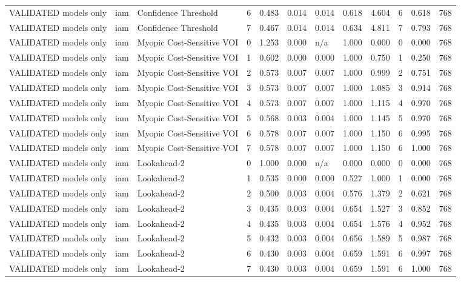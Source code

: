 \begin{table}[!ht]
{\begin{tabular}{llllllllllll}
VALIDATED models only & iam & Confidence Threshold & 6 & 0.483 & 0.014 & 0.014 & 0.618 & 4.604 & 6 & 0.618 & 768 \\
VALIDATED models only & iam & Confidence Threshold & 7 & 0.467 & 0.014 & 0.014 & 0.634 & 4.811 & 7 & 0.793 & 768 \\
VALIDATED models only & iam & Myopic Cost-Sensitive VOI & 0 & 1.253 & 0.000 & n/a & 1.000 & 0.000 & 0 & 0.000 & 768 \\
VALIDATED models only & iam & Myopic Cost-Sensitive VOI & 1 & 0.602 & 0.000 & 0.000 & 1.000 & 0.750 & 1 & 0.250 & 768 \\
VALIDATED models only & iam & Myopic Cost-Sensitive VOI & 2 & 0.573 & 0.007 & 0.007 & 1.000 & 0.999 & 2 & 0.751 & 768 \\
VALIDATED models only & iam & Myopic Cost-Sensitive VOI & 3 & 0.573 & 0.007 & 0.007 & 1.000 & 1.085 & 3 & 0.914 & 768 \\
VALIDATED models only & iam & Myopic Cost-Sensitive VOI & 4 & 0.573 & 0.007 & 0.007 & 1.000 & 1.115 & 4 & 0.970 & 768 \\
VALIDATED models only & iam & Myopic Cost-Sensitive VOI & 5 & 0.568 & 0.003 & 0.004 & 1.000 & 1.145 & 5 & 0.970 & 768 \\
VALIDATED models only & iam & Myopic Cost-Sensitive VOI & 6 & 0.578 & 0.007 & 0.007 & 1.000 & 1.150 & 6 & 0.995 & 768 \\
VALIDATED models only & iam & Myopic Cost-Sensitive VOI & 7 & 0.578 & 0.007 & 0.007 & 1.000 & 1.150 & 6 & 1.000 & 768 \\
VALIDATED models only & iam & Lookahead-2 & 0 & 1.000 & 0.000 & n/a & 0.000 & 0.000 & 0 & 0.000 & 768 \\
VALIDATED models only & iam & Lookahead-2 & 1 & 0.535 & 0.000 & 0.000 & 0.527 & 1.000 & 1 & 0.000 & 768 \\
VALIDATED models only & iam & Lookahead-2 & 2 & 0.500 & 0.003 & 0.004 & 0.576 & 1.379 & 2 & 0.621 & 768 \\
VALIDATED models only & iam & Lookahead-2 & 3 & 0.435 & 0.003 & 0.004 & 0.654 & 1.527 & 3 & 0.852 & 768 \\
VALIDATED models only & iam & Lookahead-2 & 4 & 0.435 & 0.003 & 0.004 & 0.654 & 1.576 & 4 & 0.952 & 768 \\
VALIDATED models only & iam & Lookahead-2 & 5 & 0.432 & 0.003 & 0.004 & 0.656 & 1.589 & 5 & 0.987 & 768 \\
VALIDATED models only & iam & Lookahead-2 & 6 & 0.430 & 0.003 & 0.004 & 0.659 & 1.591 & 6 & 0.997 & 768 \\
VALIDATED models only & iam & Lookahead-2 & 7 & 0.430 & 0.003 & 0.004 & 0.659 & 1.591 & 6 & 1.000 & 768 \\
\bottomrule
\end{tabular}}
\end{table}
